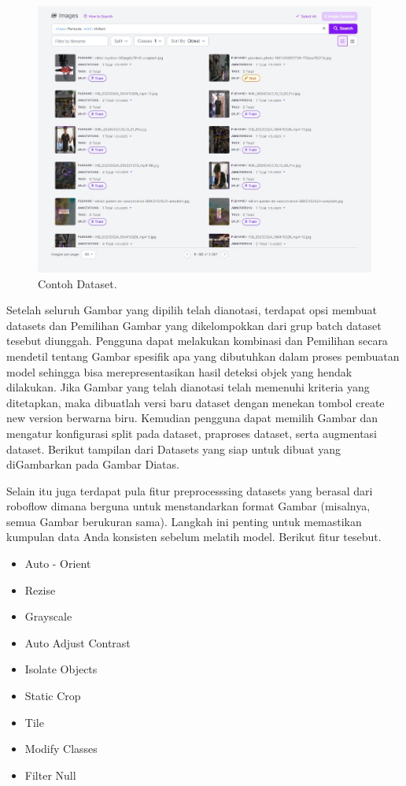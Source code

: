 \begin{figure}[H]
  \centering
  \includegraphics[scale=0.4]{gambar/roboflow Dataset.jpg}
  \caption{Contoh Dataset.}
  \label{fig:Mengupload dataset ke roboflow}
\end{figure}

Setelah seluruh Gambar yang dipilih telah dianotasi, terdapat opsi membuat datasets dan Pemilihan Gambar yang dikelompokkan dari grup batch dataset tesebut diunggah. Pengguna dapat melakukan kombinasi dan Pemilihan secara mendetil tentang Gambar spesifik apa yang dibutuhkan dalam proses pembuatan model sehingga bisa merepresentasikan hasil deteksi objek yang hendak dilakukan. Jika Gambar yang telah
dianotasi telah memenuhi kriteria yang ditetapkan, maka dibuatlah versi baru dataset dengan menekan tombol create new version berwarna biru. Kemudian pengguna dapat memilih Gambar dan mengatur konfigurasi split pada dataset, praproses dataset, serta augmentasi dataset. Berikut tampilan dari Datasets yang siap untuk dibuat yang diGambarkan pada Gambar Diatas.

Selain itu juga terdapat pula fitur preprocesssing datasets yang berasal dari roboflow dimana berguna untuk menstandarkan format Gambar (misalnya, semua Gambar berukuran sama). Langkah ini penting untuk memastikan kumpulan data Anda konsisten sebelum melatih model. Berikut fitur tesebut.

\begin{itemize}
    \item Auto - Orient
    \item Rezise
    \item Grayscale
    \item Auto Adjust Contrast
    \item Isolate Objects
    \item Static Crop
    \item Tile
    \item Modify Classes
    \item Filter Null
\end{itemize}

